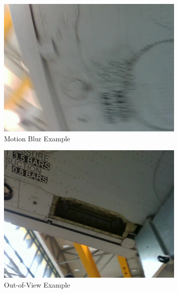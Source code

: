 \documentclass[12pt,oneside]{book} %
\begin{document}
\begin{figure}[H]
    \centering
    \begin{subfigure}[b]{0.45\textwidth}
        \includegraphics[width=\textwidth]{figures/image_hard_2.jpg}
        \caption{Motion Blur Example}\label{fig:motion-blur-example}
    \end{subfigure}
    \hfill
    \begin{subfigure}[b]{0.45\textwidth}
        \includegraphics[width=\textwidth]{figures/image_hard_3.jpg}
        \caption{Out-of-View Example}\label{fig:out-of-view-example}
    \end{subfigure}
    \hfill
    \begin{subfigure}[b]{0.45\textwidth}

\end{subfigure}
\end{figure}
\end{document}
